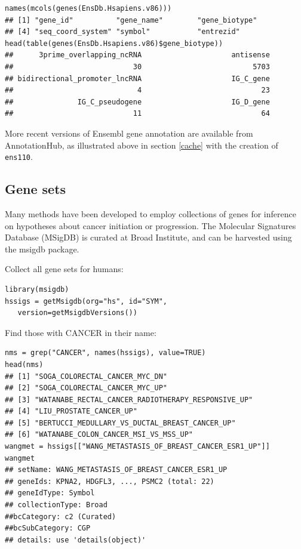 \documentclass[graybox]{svmult}
\begin{document}
\begin{shaded}
\begin{verbatim}
names(mcols(genes(EnsDb.Hsapiens.v86)))
## [1] "gene_id"          "gene_name"        "gene_biotype"     
## [4] "seq_coord_system" "symbol"           "entrezid"
head(table(genes(EnsDb.Hsapiens.v86)$gene_biotype))
##      3prime_overlapping_ncRNA                     antisense 
##                            30                          5703 
## bidirectional_promoter_lncRNA                     IG_C_gene 
##                             4                            23 
##               IG_C_pseudogene                     IG_D_gene 
##                            11                            64
\end{verbatim}
\end{shaded}

More recent versions of Ensembl gene annotation are available
from AnnotationHub, as illustrated above in section \ref{cache} with
the creation of \texttt{ens110}.

\subsection{Gene sets}\label{gene-sets}

Many methods have been developed to employ collections
of genes for inference on hypotheses about cancer
initiation or progression. The Molecular Signatures Database (MSigDB)
is curated at Broad Institute, and can be harvested
using the msigdb package.

Collect all gene sets for humans:

\begin{shaded}
\begin{verbatim}
library(msigdb)
hssigs = getMsigdb(org="hs", id="SYM", 
   version=getMsigdbVersions())
\end{verbatim}
\end{shaded}

Find those with CANCER in their name:

\begin{shaded}
\begin{verbatim}
nms = grep("CANCER", names(hssigs), value=TRUE)
head(nms)
## [1] "SOGA_COLORECTAL_CANCER_MYC_DN"
## [2] "SOGA_COLORECTAL_CANCER_MYC_UP"
## [3] "WATANABE_RECTAL_CANCER_RADIOTHERAPY_RESPONSIVE_UP"
## [4] "LIU_PROSTATE_CANCER_UP"
## [5] "BERTUCCI_MEDULLARY_VS_DUCTAL_BREAST_CANCER_UP"
## [6] "WATANABE_COLON_CANCER_MSI_VS_MSS_UP"
wangmet = hssigs[["WANG_METASTASIS_OF_BREAST_CANCER_ESR1_UP"]]
wangmet
## setName: WANG_METASTASIS_OF_BREAST_CANCER_ESR1_UP
## geneIds: KPNA2, HDGFL3, ..., PSMC2 (total: 22)
## geneIdType: Symbol
## collectionType: Broad
##bcCategory: c2 (Curated)
##bcSubCategory: CGP
## details: use 'details(object)'
\end{verbatim}
\end{shaded}
\end{document}
